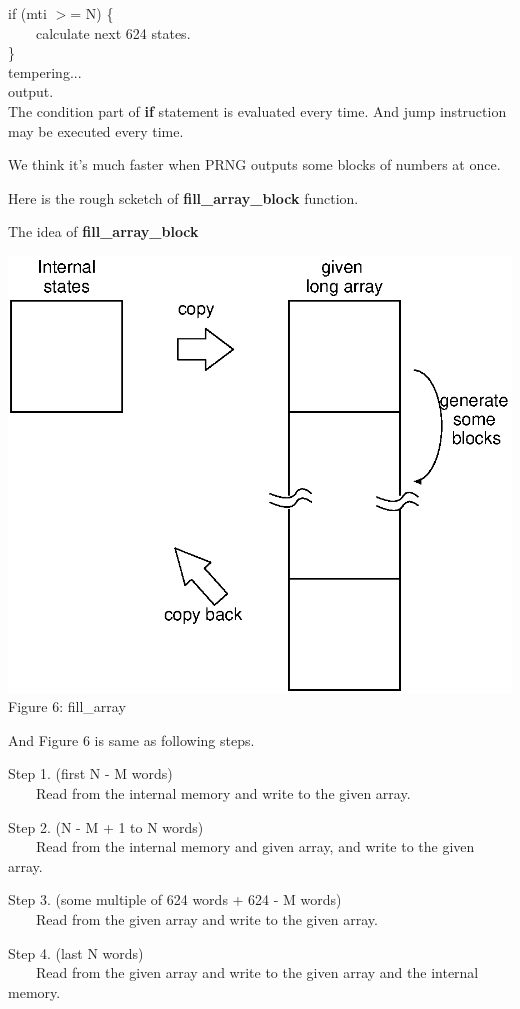 \documentclass[a4j,12pt,landscape]{jarticle}
\begin{document}
\vspace{\baselineskip}
if (mti $>$= N) \{\\
~~~~calculate next 624 states.\\
\}\\
tempering...\\
output.\\

The condition part of {\bf if} statement is evaluated every time.
And jump instruction may be executed every time.

We think it's much faster when PRNG outputs
some blocks of numbers at once.

\newpage
Here is the rough scketch of {\bf fill\_array\_block} function.

The idea of {\bf fill\_array\_block}
\begin{center}
\includegraphics[width=0.7\linewidth,height=0.7\textheight,
keepaspectratio]{fill_array.eps}
\\
Figure 6: fill\_array
\end{center}
\newpage
And Figure 6 is same as following steps.


Step 1. (first N - M words) \\
~~~~Read from the internal memory and write to the given array.

Step 2. (N - M + 1 to N words) \\
~~~~Read from the internal memory and given array, and 
write to the given array.

Step 3. (some multiple of 624 words + 624 - M words)\\
~~~~Read from the given array and write to the given array.

Step 4. (last N words)\\
~~~~Read from the given array and write to the given array and
 the internal memory.
\end{document}
